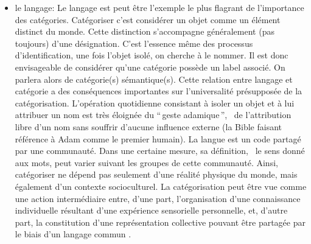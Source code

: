 \begin{itemize}
\item le langage: Le langage est peut être l'exemple le plus flagrant de l'importance des catégories. Catégoriser c'est considérer un objet comme un élément distinct du monde. Cette distinction s'accompagne généralement (pas toujours) d'une désignation. C'est l'essence même des processus d'identification, une fois l'objet isolé, on cherche à le nommer. Il est donc envisageable de considérer qu'une catégorie possède un label associé. On parlera alors de catégorie(s) sémantique(s). Cette relation entre langage et catégorie a des conséquences importantes sur l'universalité présupposée de la catégorisation. L'opération quotidienne consistant à isoler un objet et à lui attribuer un nom est très éloignée du ``\,geste adamique\,'', \ie~de l'attribution libre d'un nom sans souffrir d'aucune influence externe (la Bible faisant référence à Adam comme le premier humain). La langue est un code partagé par une communauté. Dans une certaine mesure, sa définition, \ie~le sens donné aux mots, peut varier suivant les groupes de cette communauté. Ainsi, catégoriser ne dépend pas seulement d'une réalité physique du monde, mais également d'un contexte socioculturel. La catégorisation peut être vue comme une action intermédiaire entre, d'une part, l'organisation d'une connaissance individuelle résultant d'une expérience sensorielle personnelle, et, d'autre part, la constitution d'une représentation collective pouvant être partagée par le biais d'un langage commun \citep{dubois2006cognitive}. 

\end{itemize}
